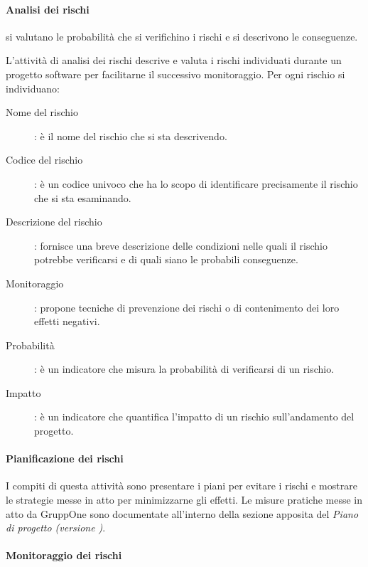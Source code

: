 \documentclass[../../norme-di-progetto.tex]{subfiles}
\begin{document}
\paragraph{Analisi dei rischi}%
\label{par:analisi__dei_rischi}

si valutano le probabilità che si verifichino i rischi e si descrivono le conseguenze.

L'attività di analisi dei rischi descrive e valuta i rischi individuati durante un progetto software per facilitarne il successivo monitoraggio. Per ogni rischio si individuano:
\begin{description}
  \item[Nome del rischio]: è il nome del rischio che si sta descrivendo.
  \item[Codice del rischio]: è un codice univoco che ha lo scopo di identificare precisamente il rischio che si sta esaminando.
  \item[Descrizione del rischio]: fornisce una breve descrizione delle condizioni nelle quali il rischio potrebbe verificarsi e di quali siano le probabili conseguenze.
  \item[Monitoraggio]: propone tecniche di prevenzione dei rischi o di contenimento dei loro effetti negativi.
  \item[Probabilità]: è un indicatore che misura la probabilità di verificarsi di un rischio.
  \item[Impatto]: è un indicatore che quantifica l'impatto di un rischio sull'andamento del progetto.
\end{description}

\paragraph{Pianificazione dei rischi}%
\label{par:pianificazione_dei_rischi}

I compiti di questa attività sono presentare i piani per evitare i rischi e mostrare le strategie messe in atto per minimizzarne gli effetti.
Le misure pratiche messe in atto da GruppOne sono documentate all'interno della sezione apposita del \textit{Piano di progetto (versione \versione)}.


\paragraph{Monitoraggio dei rischi}%
\label{par:monitoraggio_dei_rischi}
\end{document}
